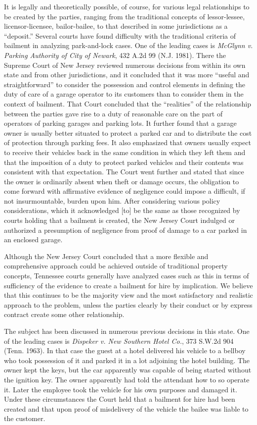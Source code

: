 It is legally and theoretically possible, of course, for various legal
relationships to be created by the parties, ranging from the traditional
concepts of lessor-lessee, licensor-licensee, bailor-bailee, to that described
in some jurisdictions as a ``deposit.'' Several courts have found difficulty
with the traditional criteria of bailment in analyzing park-and-lock cases. One
of the leading cases is \textit{McGlynn v. Parking Authority of City of
Newark}, 432 A.2d 99 (N.J. 1981). There the Supreme Court of New Jersey
reviewed numerous decisions from within its own state and from other
jurisdictions, and it concluded that it was more ``useful and straightforward''
to consider the possession and control elements in defining the duty of care of
a garage operator to its customers than to consider them in the context of
bailment. That Court concluded that the ``realities'' of the relationship
between the parties gave rise to a duty of reasonable care on the part of
operators of parking garages and parking lots. It further found that a garage
owner is usually better situated to protect a parked car and to distribute the
cost of protection through parking fees. It also emphasized that owners usually
expect to receive their vehicles back in the same condition in which they left
them and that the imposition of a duty to protect parked vehicles and their
contents was consistent with that expectation. The Court went further and
stated that since the owner is ordinarily absent when theft or damage occurs,
the obligation to come forward with affirmative evidence of negligence could
impose a difficult, if not insurmountable, burden upon him. After considering
various policy considerations, which it acknowledged [to] be the same as those
recognized by courts holding that a bailment is created, the New Jersey Court
indulged or authorized a presumption of negligence from proof of damage to a
car parked in an enclosed garage.

Although the New Jersey Court concluded that a more flexible and comprehensive
approach could be achieved outside of traditional property concepts, Tennessee
courts generally have analyzed cases such as this in terms of sufficiency of
the evidence to create a bailment for hire by implication. We believe that this
continues to be the majority view and the most satisfactory and realistic
approach to the problem, unless the parties clearly by their conduct or by
express contract create some other relationship.

The subject has been discussed in numerous previous decisions in this state. One
of the leading cases is \textit{Dispeker v. New Southern Hotel Co.}, 373 S.W.2d
904 (Tenn. 1963). In that case the guest at a hotel delivered his vehicle to a
bellboy who took possession of it and parked it in a lot adjoining the hotel
building. The owner kept the keys, but the car apparently was capable of being
started without the ignition key. The owner apparently had told the attendant
how to so operate it. Later the employee took the vehicle for his own purposes
and damaged it. Under these circumstances the Court held that a bailment for
hire had been created and that upon proof of misdelivery of the vehicle the
bailee was liable to the customer.

